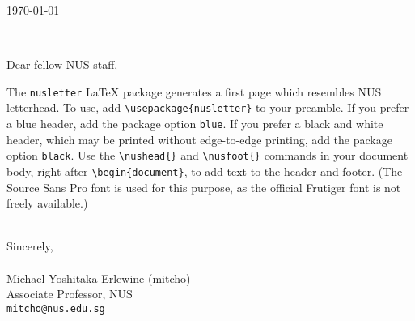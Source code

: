 \documentclass[a4paper]{article}
\begin{document}


\pagestyle{empty}

\noindent\today

\

\noindent Dear fellow NUS staff,

The \verb`nusletter` \LaTeX{} package generates a first page which resembles NUS letterhead. To use, add \verb`\usepackage{nusletter}` to your preamble. If you prefer a blue header, add the package option \verb`blue`. If you prefer a black and white header, which may be printed without edge-to-edge printing, add the package option \verb`black`. Use the \verb`\nushead{}` and \verb`\nusfoot{}` commands in your document body, right after \verb`\begin{document}`, to add text to the header and footer. (The Source Sans Pro font is used for this purpose, as the official Frutiger font is not freely available.)

\lipsum

\lipsum

\lipsum

\hspace*{3.5in}\begin{minipage}{3in}
\-\\Sincerely,\\
\\
Michael Yoshitaka Erlewine (mitcho)\\
Associate Professor, NUS\\
\texttt{mitcho@nus.edu.sg}
\end{minipage}
\end{document}
